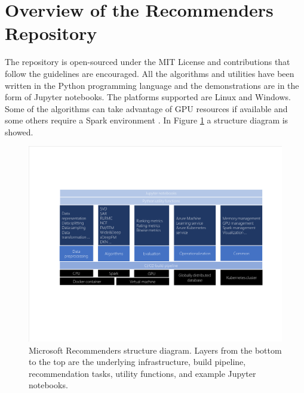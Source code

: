 \section{Overview of the Recommenders Repository}

The repository is open-sourced under the MIT License and contributions that follow the guidelines are encouraged.  
All the algorithms and utilities have been written in the Python programming language and the demonstrations are 
in the form of Jupyter notebooks.
The platforms supported are Linux and Windows. Some of the algorithms can take advantage of GPU resources if available 
and some others require a Spark environment \cite{meng2016mllib}. In Figure \ref{figure_structure} a structure diagram is showed.

\begin{figure}
  \centering
  \includegraphics[width=\textwidth,keepaspectratio]{platform_diagram_crop.pdf}
  \caption{Microsoft Recommenders structure diagram. Layers from the bottom to the top are the underlying 
  infrastructure, build pipeline, recommendation tasks, utility functions, and example Jupyter notebooks.}
  \label{figure_structure}
\end{figure}

%
%
